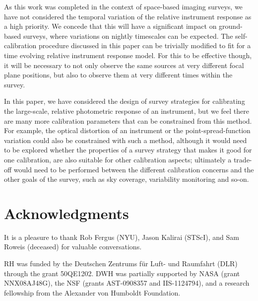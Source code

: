 \documentclass[preprint,pdftex]{aastex}
\begin{document}
As this work was completed in the context of space-based imaging surveys, we have not considered the temporal variation of the relative instrument response as a high priority. We concede that this will have a significant impact on ground-based surveys, where variations on nightly timescales can be expected. The self-calibration procedure discussed in this paper can be trivially modified to fit for a time evolving relative instrument response model. For this to be effective though, it will be necessary to not only observe the same sources at very different focal plane positions, but also to observe them at very different times within the survey.  

In this paper, we have considered the design of survey strategies for calibrating the large-scale, relative photometric response of an instrument, but we feel there are many more calibration parameters that can be constrained from this method. For example, the optical distortion of an instrument or the point-spread-function variation could also be constrained with such a method, although it would need to be explored whether the properties of a survey strategy that makes it good for one calibration, are also suitable for other calibration aspects; ultimately a trade-off would need to be performed between the different calibration concerns and the other goals of the survey, such as sky coverage, variability monitoring and so-on. 

\acknowledgments
\section{Acknowledgments}
It is a pleasure to thank Rob Fergus (NYU), Jason Kalirai (STScI),
and Sam Roweis (deceased) for valuable conversations.

RH was funded by the Deutschen Zentrums f\"ur Luft- und Raumfahrt
(DLR) through the grant 50QE1202.  DWH was partially supported by NASA
(grant NNX08AJ48G), the NSF (grants AST-0908357 and IIS-1124794), and
a research fellowship from the Alexander von Humboldt Foundation.


\begin{thebibliography}{}
\end{thebibliography}
\clearpage
\end{document}
